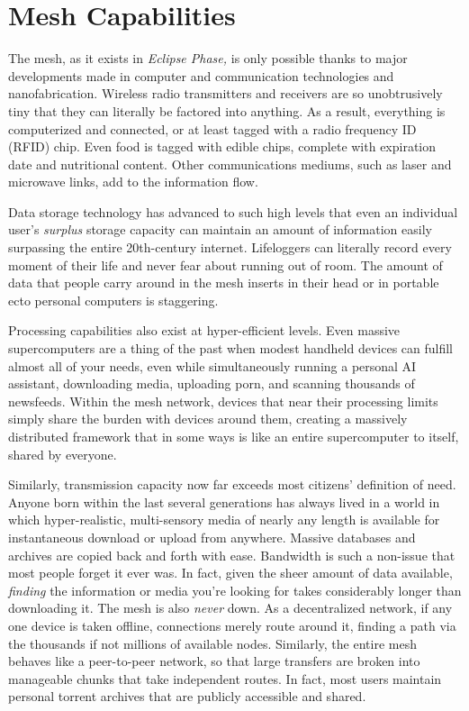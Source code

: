 \section{Mesh Capabilities} 

The mesh, as it exists in \textit{Eclipse Phase,} is only possible thanks to major developments made in computer and communication technologies and nanofabrication. Wireless radio transmitters and receivers are so unobtrusively tiny that they can literally be factored into anything. As a result, everything is computerized and connected, or at least tagged with a radio frequency ID (RFID) chip. Even food is tagged with edible chips, complete with expiration date and nutritional content. Other communications mediums, such as laser and microwave links, add to the information flow. 

Data storage technology has advanced to such high levels that even an individual user's \textit{surplus }storage capacity can maintain an amount of information easily surpassing the entire 20th-century internet. Lifeloggers can literally record every moment of their life and never fear about running out of room. The amount of data that people carry around in the mesh inserts in their head or in portable ecto personal computers is staggering. 

Processing capabilities also exist at hyper-efficient levels. Even massive supercomputers are a thing of the past when modest handheld devices can fulfill almost all of your needs, even while simultaneously running a personal AI assistant, downloading media, uploading porn, and scanning thousands of newsfeeds. Within the mesh network, devices that near their processing limits simply share the burden with devices around them, creating a massively distributed framework that in some ways is like an entire supercomputer to itself, shared by everyone. 

Similarly, transmission capacity now far exceeds most citizens' definition of need. Anyone born within the last several generations has always lived in a world in which hyper-realistic, multi-sensory media of nearly any length is available for instantaneous download or upload from anywhere. Massive databases and archives are copied back and forth with ease. Bandwidth is such a non-issue that most people forget it ever was. In fact, given the sheer amount of data available, \textit{finding }the information or media you're looking for takes considerably longer than downloading it. The mesh is also \textit{never }down. As a decentralized network, if any one device is taken offline, connections merely route around it, finding a path via the thousands if not millions of available nodes. Similarly, the entire mesh behaves like a peer-to-peer network, so that large transfers are broken into manageable chunks that take independent routes. In fact, most users maintain personal torrent archives that are publicly accessible and shared. 

